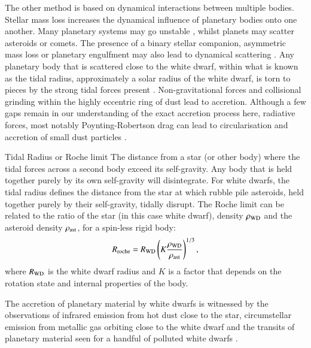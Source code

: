 \documentclass[onecolumn,authoryear]{els-mrw}
\begin{document}
The other method is based on dynamical interactions between multiple bodies. Stellar mass loss increases the dynamical influence of planetary bodies onto one another. Many planetary systems may go unstable \citep{DebesSigurdsson},%
whilst planets may scatter asteroids or comets. The presence of a binary stellar companion, asymmetric mass loss or planetary engulfment may also lead to dynamical scattering \citep{Hamers2016, Petrovich2017}. Any planetary body that is scattered close to the white dwarf, within what is known as the tidal radius, approximately a solar radius of the white dwarf, is torn to pieces by the strong tidal forces present \citep{Veras_tidaldisruption1}. %
Non-gravitational forces and collisional grinding within the highly eccentric ring of dust lead to accretion. Although a few gaps remain in our understanding of the exact accretion process here, radiative forces, most notably Poynting-Robertson drag can lead to circularisation and accretion of small dust particles \citep{Veras_review}. 

\begin{BoxTypeA}{Tidal Radius or Roche limit}
   \indent The distance from a star (or other body) where the tidal forces across a second body exceed its self-gravity. Any body that is held together purely by its own self-gravity will disintegrate. For white dwarfs, the tidal radius defines the distance from the star at which rubble pile asteroids, held together purely by their self-gravity, tidally disrupt. The Roche limit can be related to the ratio of the star (in this case white dwarf), density $\rho_{\rm WD}$ and the asteroid density $\rho_{\rm ast}$, for a spin-less rigid body:  
    \begin{equation}
        R_{\rm roche } = R_{\rm WD}\left(K \frac{\rho_{\rm WD}}{\rho_{\rm ast}}\right)^{1/3}, %
    \end{equation}
        where $R_{\rm WD}$ is the white dwarf radius and $K$ is a factor that depends on the rotation state and internal properties of the body. 
        
\end{BoxTypeA}


The accretion of planetary material by white dwarfs is witnessed by the observations of infrared emission from hot dust close to the star, circumstellar emission from metallic gas orbiting close to the white dwarf and the transits of planetary material seen for a handful of polluted white dwarfs \citep{Veras_review, Farihi_review}. 
\end{document}
